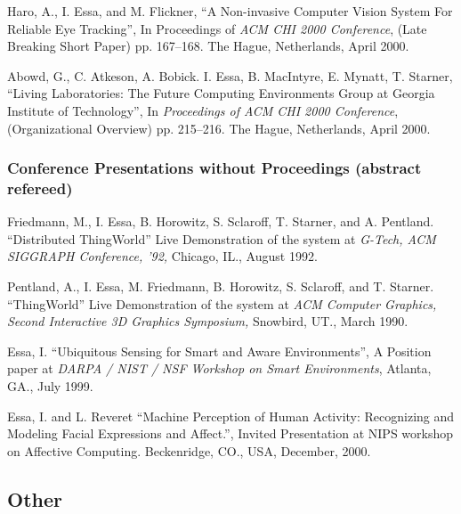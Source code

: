 \begin{pub}
\item Haro, A., I. Essa, and M. Flickner, ``A Non-invasive Computer Vision System
For Reliable Eye Tracking'', In Proceedings of \textit{ACM CHI
2000 Conference}, (Late Breaking Short Paper) pp. 167--168. The
Hague, Netherlands, April 2000. \label{pub:pupil-chi00}

\item Abowd, G., C. Atkeson, A. Bobick. I. Essa, B. MacIntyre, E. Mynatt, T.
Starner, ``Living Laboratories: The Future Computing Environments
Group at Georgia Institute of Technology'', In \textit{Proceedings
of ACM CHI 2000 Conference}, (Organizational Overview) pp.
215--216. The Hague, Netherlands, April 2000.

\end{pub}

\subsubsection{Conference Presentations without Proceedings (abstract refereed)}
\label{subsubsec:mylabel2}

\begin{pub}

\item Friedmann, M., I. Essa, B. Horowitz, S. Sclaroff, T. Starner, and A.
Pentland. ``Distributed ThingWorld'' Live Demonstration of the system at
\textit{G-Tech, ACM SIGGRAPH Conference, '92,} Chicago, IL., August 1992.

\item Pentland, A., I. Essa, M. Friedmann, B. Horowitz, S. Sclaroff, and T.
Starner. ``ThingWorld'' Live Demonstration of the system at \textit{ACM
Computer Graphics, Second Interactive 3D Graphics Symposium,} Snowbird, UT.,
March 1990.

\item Essa, I. ``Ubiquitous Sensing for Smart and Aware Environments'', A Position
paper at \textit{DARPA / NIST / NSF Workshop on Smart
Environments}, Atlanta, GA., July 1999.

\item Essa, I. and L. Reveret ``Machine Perception of Human Activity: Recognizing and
Modeling Facial Expressions and Affect.'', Invited Presentation at
NIPS workshop on Affective Computing. Beckenridge, CO., USA,
December, 2000. \label{pub:affect-nips00}

\end{pub}

\subsection{Other}
\label{subsec:other}

